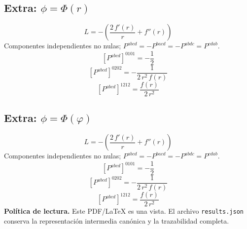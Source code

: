 \documentclass[11pt]{article}
\begin{document}
\subsection*{Extra: $\phi=\Phi\!\left(r\right)$}
\begin{dmath*}[breakdepth={5}]
L=-\left(\frac{2\,f'\!\left(r\right)}{r} + f''\!\left(r\right)\right)
\end{dmath*}
Componentes independientes no nulas; $P^{abcd}=-P^{bacd}=-P^{abdc}=P^{cdab}$.
\begin{dmath*}[breakdepth={5}]
\left[P^{abcd}\right]^{0101}=-\frac{1}{2}
\end{dmath*}
\begin{dmath*}[breakdepth={5}]
\left[P^{abcd}\right]^{0202}=-\frac{1}{2\,{r}^{2}\,f\!\left(r\right)}
\end{dmath*}
\begin{dmath*}[breakdepth={5}]
\left[P^{abcd}\right]^{1212}=\frac{f\!\left(r\right)}{2\,{r}^{2}}
\end{dmath*}
\subsection*{Extra: $\phi=\Phi\!\left(\varphi\right)$}
\begin{dmath*}[breakdepth={5}]
L=-\left(\frac{2\,f'\!\left(r\right)}{r} + f''\!\left(r\right)\right)
\end{dmath*}
Componentes independientes no nulas; $P^{abcd}=-P^{bacd}=-P^{abdc}=P^{cdab}$.
\begin{dmath*}[breakdepth={5}]
\left[P^{abcd}\right]^{0101}=-\frac{1}{2}
\end{dmath*}
\begin{dmath*}[breakdepth={5}]
\left[P^{abcd}\right]^{0202}=-\frac{1}{2\,{r}^{2}\,f\!\left(r\right)}
\end{dmath*}
\begin{dmath*}[breakdepth={5}]
\left[P^{abcd}\right]^{1212}=\frac{f\!\left(r\right)}{2\,{r}^{2}}
\end{dmath*}
\bigskip\noindent\textbf{Política de lectura.} Este PDF/LaTeX es una vista. El archivo \texttt{results.json} conserva la representación intermedia canónica y la trazabilidad completa.
\end{document}
